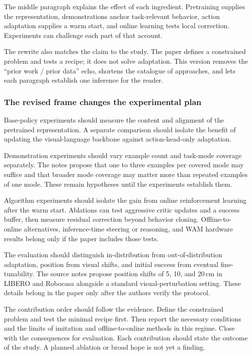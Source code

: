 The middle paragraph explains the effect of each ingredient. Pretraining
supplies the representation, demonstrations anchor task-relevant behavior,
action adaptation supplies a warm start, and online learning tests local
correction. Experiments can challenge each part of that account.

The rewrite also matches the claim to the study. The paper defines a
constrained problem and tests a recipe; it does not solve adaptation. This
version removes the ``prior work / prior data'' echo, shortens the catalogue of
approaches, and lets each paragraph establish one inference for the reader.

\subsubsection*{The revised frame changes the experimental plan}

Base-policy experiments should measure the content and alignment of the
pretrained representation. A separate comparison should isolate the benefit of
updating the visual-language backbone against action-head-only adaptation.

Demonstration experiments should vary example count and task-mode coverage
separately. The notes propose that one to three examples per covered mode may
suffice and that broader mode coverage may matter more than repeated examples
of one mode. These remain hypotheses until the experiments establish them.

Algorithm experiments should isolate the gain from online reinforcement
learning after the warm start. Ablations can test aggressive critic updates
and a success buffer, then measure residual correction beyond behavior
cloning. Offline-to-online alternatives, inference-time steering or reasoning,
and WAM hardware results belong only if the paper includes those tests.

The evaluation should distinguish in-distribution from out-of-distribution
adaptation, position from visual shifts, and initial success from eventual
fine-tunability. The source notes propose position shifts of 5, 10, and
20\,cm in LIBERO and Robocasa alongside a standard visual-perturbation setting.
These details belong in the paper only after the authors verify the protocol.

The contribution order should follow the evidence. Define the constrained
problem and test the minimal recipe first. Then report the necessary conditions
and the limits of imitation and offline-to-online methods in this regime. Close
with the consequences for evaluation. Each contribution should state the
outcome of the study. A planned ablation or broad hope is not yet a finding.


